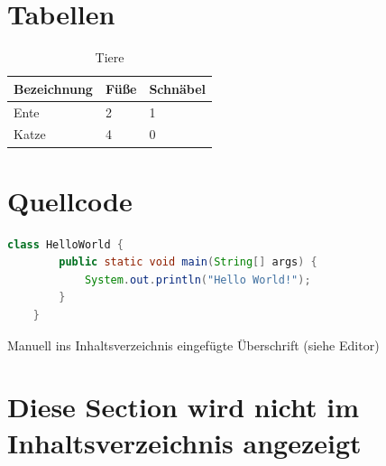 \section{Tabellen}
\begin{table}[H]
    \centering
    \begin{tabular}[H]{l|l|l}
        Bezeichnung & Füße& Schnäbel\\
        \hline
        Ente& 2& 1\\
        \hline
        Katze& 4& 0\\
    \end{tabular}
    \caption{Tiere}
\end{table}


\section{Quellcode}
\begin{lstlisting}[language=java, caption=Hello World in Java, captionpos=b]
    class HelloWorld {
        public static void main(String[] args) {
            System.out.println("Hello World!");
        }
    }
\end{lstlisting}

Manuell ins Inhaltsverzeichnis eingefügte Überschrift (siehe Editor)

\section*{Diese Section wird nicht im Inhaltsverzeichnis angezeigt} %
